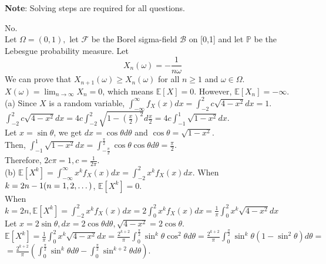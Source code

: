 \documentclass{homework}
\begin{document}
\maketitle
\textbf{Note}: Solving steps are required for all questions.

\question %
No. \\
Let $\Omega=(0,1),$ let $\mathcal{F}$ be the Borel sigma-field $\mathcal{B}$ on [0,1] and 
let $\mathbb{P}$ be the Lebesgue probability measure. 
Let
$$
X_{n}(\omega)=-\frac{1}{n\omega}
$$
We can prove that $X_{n+1}(\omega) \geq X_{n}(\omega)$ for all $n \geq 1$ and $\omega \in \Omega$.\\
$X(\omega) = \lim_{n \to \infty}X_{n} = 0$, which means $\mathbb{E}[X]=0$. However, $\mathbb{E}[X_{n}]=-\infty$.
\question %
(a) Since $X$ is a random variable, $\int_{-\infty}^{\infty}f_{X}(x)dx
=\int_{-2}^{2}c\sqrt{4-x^2}dx=1$.\\
$\int_{-2}^{2}c\sqrt{4-x^2}dx=4c\int_{-2}^{2}\sqrt{1-(\frac{x}{2})^2}d\frac{x}{2}
=4c\int_{-1}^{1}\sqrt{1-x^2}dx$.\\
Let $x=\sin\theta$, we get $dx=\cos\theta d\theta$ and $\cos \theta=\sqrt{1-x^2}$.\\
Then, $\int_{-1}^{1}\sqrt{1-x^2}dx = \int_{-\frac{\pi}{2}}^{\frac{\pi}{2}}\cos\theta\cos\theta d\theta = \frac{\pi}{2}$.\\
Therefore, $2c\pi=1, c=\frac{1}{2\pi}$.\\

(b) $\mathbb{E}[X^k]=\int_{-\infty}^{\infty}x^kf_{X}(x)dx=\int_{-2}^{2}x^kf_{X}(x)dx$.
When $k=2n-1 \space (n=1,2,\dots)$, $\mathbb{E}[X^k]=0$.\\
When $k=2n, \mathbb{E}[X^k]=\int_{-2}^{2}x^kf_{X}(x)dx=2\int_{0}^{2}x^kf_{X}(x)dx
=\frac{1}{\pi}\int_{0}^{2}x^k \sqrt{4-x^2}dx$\\
Let $x=2\sin\theta, dx = 2\cos\theta d\theta, \sqrt{4-x^2}=2\cos\theta$.\\
$\mathbb{E}[X^k]=\frac{1}{\pi}\int_{0}^{2}x^k\sqrt{4-x^2}dx=\frac{2^{k+2}}{\pi}\int_{0}^{\frac{\pi}{2}}\sin^{k}\theta \cos^2\theta d\theta
=\frac{2^{k+2}}{\pi}\int_{0}^{\frac{\pi}{2}}\sin^{k}\theta (1-\sin^2\theta) d\theta=$\\
$=\frac{2^{k+2}}{\pi}(\int_{0}^{\frac{\pi}{2}}\sin^{k}\theta d\theta - \int_{0}^{\frac{\pi}{2}}\sin^{k+2}\theta d\theta)$.\\
\end{document}
